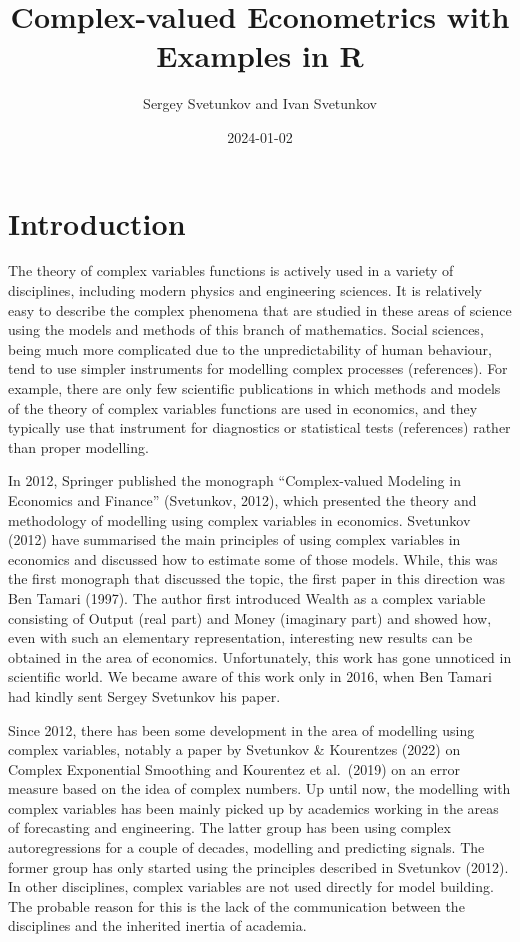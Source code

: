 \documentclass[
]{book}
\title{Complex-valued Econometrics with Examples in R}
\author{Sergey Svetunkov and Ivan Svetunkov}
\date{2024-01-02}
\begin{document}
\maketitle

{
\setcounter{tocdepth}{2}
\tableofcontents
}
\hypertarget{introduction}{%
\chapter*{Introduction}\label{introduction}}

The theory of complex variables functions is actively used in a variety of disciplines, including modern physics and engineering sciences. It is relatively easy to describe the complex phenomena that are studied in these areas of science using the models and methods of this branch of mathematics. Social sciences, being much more complicated due to the unpredictability of human behaviour, tend to use simpler instruments for modelling complex processes (references). For example, there are only few scientific publications in which methods and models of the theory of complex variables functions are used in economics, and they typically use that instrument for diagnostics or statistical tests (references) rather than proper modelling.

In 2012, Springer published the monograph ``Complex-valued Modeling in Economics and Finance'' (Svetunkov, 2012), which presented the theory and methodology of modelling using complex variables in economics. Svetunkov (2012) have summarised the main principles of using complex variables in economics and discussed how to estimate some of those models. While, this was the first monograph that discussed the topic, the first paper in this direction was Ben Tamari (1997). The author first introduced Wealth as a complex variable consisting of Output (real part) and Money (imaginary part) and showed how, even with such an elementary representation, interesting new results can be obtained in the area of economics. Unfortunately, this work has gone unnoticed in scientific world. We became aware of this work only in 2016, when Ben Tamari had kindly sent Sergey Svetunkov his paper.

Since 2012, there has been some development in the area of modelling using complex variables, notably a paper by Svetunkov \& Kourentzes (2022) on Complex Exponential Smoothing and Kourentez et al.~(2019) on an error measure based on the idea of complex numbers. Up until now, the modelling with complex variables has been mainly picked up by academics working in the areas of forecasting and engineering. The latter group has been using complex autoregressions for a couple of decades, modelling and predicting signals. The former group has only started using the principles described in Svetunkov (2012). In other disciplines, complex variables are not used directly for model building. The probable reason for this is the lack of the communication between the disciplines and the inherited inertia of academia.
\end{document}
